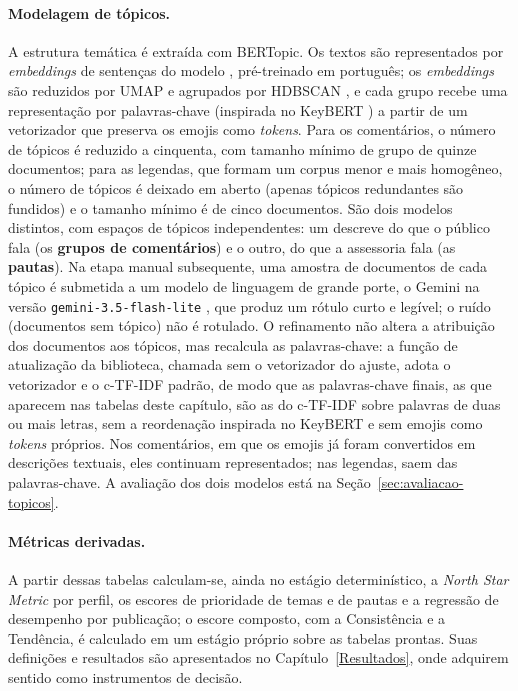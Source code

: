 \paragraph*{Modelagem de tópicos.} A estrutura temática é extraída com BERTopic. Os textos são representados por \emph{embeddings} de sentenças do modelo  \cite{rufimelo2024}, pré-treinado em português; os \emph{embeddings} são reduzidos por UMAP \cite{mcinnes2018} e agrupados por HDBSCAN \cite{campello2013}, e cada grupo recebe uma representação por palavras-chave (inspirada no KeyBERT \cite{grootendorst2020keybert}) a partir de um vetorizador que preserva os emojis como \emph{tokens}. Para os comentários, o número de tópicos é reduzido a cinquenta, com tamanho mínimo de grupo de quinze documentos; para as legendas, que formam um corpus menor e mais homogêneo, o número de tópicos é deixado em aberto (apenas tópicos redundantes são fundidos) e o tamanho mínimo é de cinco documentos. São dois modelos distintos, com espaços de tópicos independentes: um descreve do que o público fala (os \textbf{grupos de comentários}) e o outro, do que a assessoria fala (as \textbf{pautas}). Na etapa manual subsequente, uma amostra de documentos de cada tópico é submetida a um modelo de linguagem de grande porte, o Gemini na versão \texttt{gemini-3.5-flash-lite} \cite{google2026gemini}, que produz um rótulo curto e legível; o ruído (documentos sem tópico) não é rotulado. O refinamento não altera a atribuição dos documentos aos tópicos, mas recalcula as palavras-chave: a função de atualização da biblioteca, chamada sem o vetorizador do ajuste, adota o vetorizador e o c-TF-IDF padrão, de modo que as palavras-chave finais, as que aparecem nas tabelas deste capítulo, são as do c-TF-IDF sobre palavras de duas ou mais letras, sem a reordenação inspirada no KeyBERT e sem emojis como \emph{tokens} próprios. Nos comentários, em que os emojis já foram convertidos em descrições textuais, eles continuam representados; nas legendas, saem das palavras-chave. A avaliação dos dois modelos está na Seção~\ref{sec:avaliacao-topicos}.

\paragraph*{Métricas derivadas.} A partir dessas tabelas calculam-se, ainda no estágio determinístico, a \emph{North Star Metric} por perfil, os escores de prioridade de temas e de pautas e a regressão de desempenho por publicação; o escore composto, com a Consistência e a Tendência, é calculado em um estágio próprio sobre as tabelas prontas. Suas definições e resultados são apresentados no Capítulo~\ref{Resultados}, onde adquirem sentido como instrumentos de decisão.

